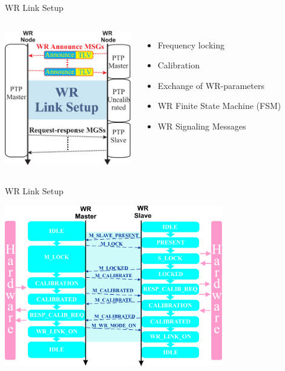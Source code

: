 \documentclass[compress,red]{beamer}
\begin{document}
\begin{frame}{WR Link Setup }

  \begin{columns}[c]

      \begin{center}
      \includegraphics[width=5.5cm]{protocol/wrLinkSetup.pdf}
      \end{center}



      \begin{itemize}
	\item Frequency locking
	\item Calibration
	\item Exchange of WR-parameters
	\item WR Finite State Machine (FSM)
	\item WR Signaling Messages
      \end{itemize}

  \end{columns}

\end{frame}
\begin{frame}{WR Link Setup}

      \begin{center}
      \includegraphics[width=9.5cm]{protocol/wrLinkSetupFSM.pdf}
      \end{center}

\end{frame}
\end{document}

